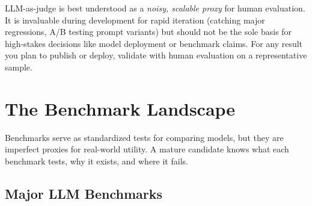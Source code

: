 \begin{keyinsight}
LLM-as-judge is best understood as a \emph{noisy, scalable proxy} for human
evaluation.  It is invaluable during development for rapid iteration (catching
major regressions, A/B testing prompt variants) but should not be the sole
basis for high-stakes decisions like model deployment or benchmark claims.  For
any result you plan to publish or deploy, validate with human evaluation on
a representative sample.
\end{keyinsight}

\section{The Benchmark Landscape}
\label{sec:benchmarks}

Benchmarks serve as standardized tests for comparing models, but they are
imperfect proxies for real-world utility.  A mature candidate knows what each
benchmark tests, why it exists, and where it fails.

\subsection{Major LLM Benchmarks}

